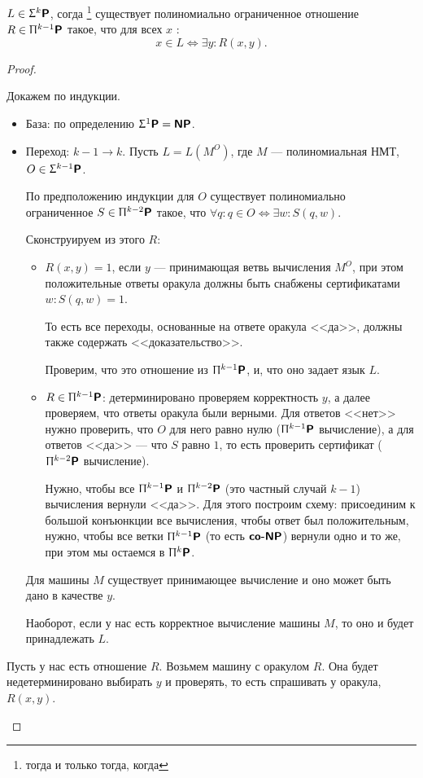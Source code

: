 \begin{thm}
    $ L \in \Upsigma^{k}\textmd{\textbf{\textsf{P}}}$, согда \footnote{тогда и только тогда, когда} существует полиномиально ограниченное отношение $ R \in \Uppi^{k-1}\textmd{\textbf{\textsf{P}}}$ такое, что для всех $ x$ :
	\[
		x \in L \Longleftrightarrow \exists y \colon R(x, y)
	.\] 
\end{thm}
\begin{proof}
   \begin{description}
       \item {} 
		   Докажем по индукции. 
		   \begin{itemize}
			   \item База: по определению $ \Upsigma^{1}\textmd{\textbf{\textsf{P}}} = \textmd{\textbf{\textsf{NP}}}$.
			   \item Переход: $ k-1 \to  k$. Пусть $ L = L(M^{O})$, где $ M$ --- полиномиальная НМТ, $ O \in \Upsigma^{k-1}\textmd{\textbf{\textsf{P}}}$.

				   По предположению индукции для $ O$ существует полиномиально ограниченное $ S \in \Uppi^{k-2}\textmd{\textbf{\textsf{P}}}$ такое, что $ \forall q\colon q \in O \Longleftrightarrow \exists w \colon S(q, w)$.

				   Сконструируем из этого $ R$:
				   \begin{itemize}
					   \item $ R(x, y) = 1$, если $ y$ --- принимающая ветвь вычисления $ M^{O}$, при этом положительные ответы оракула должны быть снабжены сертификатами  $ w\colon  S(q, w) = 1$.

						   То есть все переходы,  основанные на ответе оракула <<да>>, должны также содержать <<доказательство>>.

						   Проверим, что это отношение из $ \Uppi^{k-1}\textmd{\textbf{\textsf{P}}}$, и, что оно задает язык $ L$.
					   \item $ R \in \Uppi^{k-1}\textmd{\textbf{\textsf{P}}}$: детерминировано проверяем корректность $ y$, а далее проверяем, что ответы оракула были верными. Для ответов <<нет>> нужно проверить, что $ O$ для него равно нулю ($ \Uppi^{k-1}\textmd{\textbf{\textsf{P}}}$ вычисление), а для ответов <<да>>  --- что  $ S$ равно  $ 1$, то есть проверить сертификат ($ \Uppi^{k-2}\textmd{\textbf{\textsf{P}}}$ вычисление).

						   Нужно, чтобы все $ \Uppi^{k-1}\textmd{\textbf{\textsf{P}}}$ и $ \Uppi^{k-2}\textmd{\textbf{\textsf{P}}}$ (это частный случай $ k-1$) вычисления вернули <<да>>. Для этого построим схему: присоединим к большой конъюнкции все вычисления, чтобы ответ был положительным, нужно, чтобы все ветки $ \Uppi^{k-1}\textmd{\textbf{\textsf{P}}}$ (то есть $ \textmd{\textbf{\textsf{co-NP}}}$) вернули одно и то же, при этом мы остаемся в $ \Uppi^{k}\textmd{\textbf{\textsf{P}}}$.
				   \end{itemize}
				   Для машины $ M$ существует принимающее вычисление и оно может быть дано в качестве $ y$.

				   Наоборот, если у нас есть корректное вычисление машины $ M$, то оно и будет принадлежать $ L$.
		   \end{itemize}
       \item {}
		   Пусть у нас есть отношение $ R$.
		   Возьмем машину с оракулом $ R$.
		   Она будет недетерминировано 
		   выбирать $ y$ и проверять, то есть спрашивать у оракула, $ R(x, y)$.
   \end{description}  
\end{proof}
